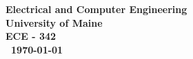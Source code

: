 \documentclass{article}
\begin{document}
\begin{titlepage}
\begin{center}
\begin{abstract}
        
        
        
        \end{abstract}
        
        
        \vspace{02.5cm}
        \textbf{
        Electrical and Computer Engineering\\
        University of Maine\\
        ECE - 342\\\ \today}
    \vspace{.5cm}
    
    \end{center}
\end{titlepage}


\clearpage

\end{document}
